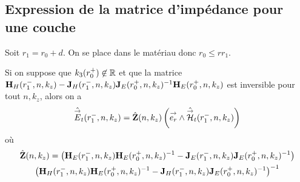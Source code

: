   \subsection{Expression de la matrice d'impédance pour une couche}

    Soit \(r_1 = r_0 + d\). On se place dans le matériau donc \(r_0 \le r r_1\).

    \begin{prop}
      Si on suppose que \(k_3(r_0^+) \not \in \mathbb R\) et que la matrice \(\mathbf{H}_{H}(r_1^-,n,k_z) - \mathbf{J}_{H}(r_1^-,n,k_z)\mathbf{J}_{E}(r_0^+,n,k_z)^{-1}\mathbf{H}_{E}(r_0^+,n,k_z)\) est inversible pour tout \(n,k_z\), alors on a 
      \begin{equation*}
        \hat {{\overset{\rightarrow}{E}}}_t(r_1^-,n,k_z) = \hat {\mathbf{Z}}(n,k_z) \left({\overset{\rightarrow}{e_r}}\wedge \hat {{\overset{\rightarrow}{\mathcal{H}}}}_t(r_1^-,n,k_z)\right)
      \end{equation*}
      où
      \begin{multline*}
        \hat {\mathbf{Z}}(n,k_z) =
        \left(\mathbf{H}_{E}(r_1^-,n,k_z)\mathbf{H}_{E}(r_0^+,n,k_z)^{-1} - \mathbf{J}_{E}(r_1^-,n,k_z)\mathbf{J}_{E}(r_0^+,n,k_z)^{-1}\right)\\
        \left(\mathbf{H}_{H}(r_1^-,n,k_z)\mathbf{H}_{E}(r_0^+,n,k_z)^{-1} - \mathbf{J}_{H}(r_1^-,n,k_z)\mathbf{J}_{E}(r_0^+,n,k_z)^{-1}\right)^{-1}
      \end{multline*}
    \end{prop}

